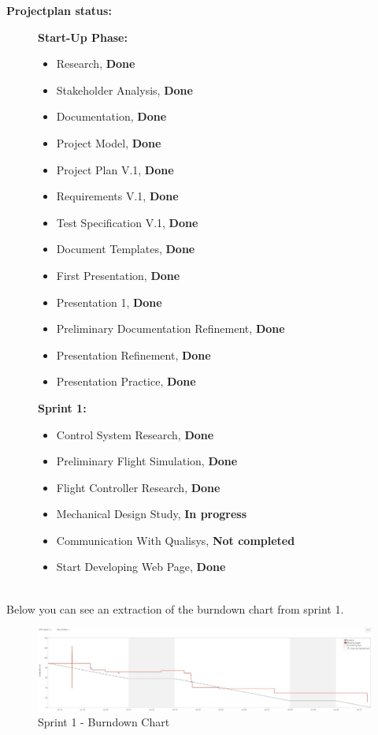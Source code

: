 \textbf{Projectplan status:}

\begin{figure}[h]
\begin{minipage}[t]{0.5\textwidth}
\textbf{Start-Up Phase:}
\begin{itemize}
	\item Research, \textbf{Done}
	\item Stakeholder Analysis, \textbf{Done}
	\item Documentation, \textbf{Done}
	\item Project Model, \textbf{Done}
	\item Project Plan V.1, \textbf{Done}
	\item Requirements V.1, \textbf{Done}
	\item Test Specification V.1, \textbf{Done}
	\item Document Templates, \textbf{Done}
	\item First Presentation, \textbf{Done}
	\item Presentation 1, \textbf{Done}
    \item Preliminary Documentation Refinement, \textbf{Done}
	\item Presentation Refinement, \textbf{Done}
	\item Presentation Practice, \textbf{Done}
\end{itemize}
\end{minipage}
\hfill
\begin{minipage}[t]{0.5\textwidth}
\textbf{Sprint 1:}
\begin{itemize}
\item Control System Research, \textbf{Done}
    \item Preliminary Flight Simulation, \textbf{Done}
	\item Flight Controller Research, \textbf{Done}
	\item Mechanical Design Study, \textbf{In progress} 
	\item Communication With Qualisys, \textbf{Not completed}
	\item Start Developing Web Page, \textbf{Done}   
\end{itemize}
\end{minipage}
\hfill
\end{figure}\\


Below you can see an extraction of the burndown chart from sprint 1.

\begin{figure}[h]
        \centering
        \includegraphics[width = 1\textwidth]{VAPIQ-PICTURES/BDSprint1}
        \caption{Sprint 1 - Burndown Chart}
        \label{fig:bds1}
    \end{figure}  

